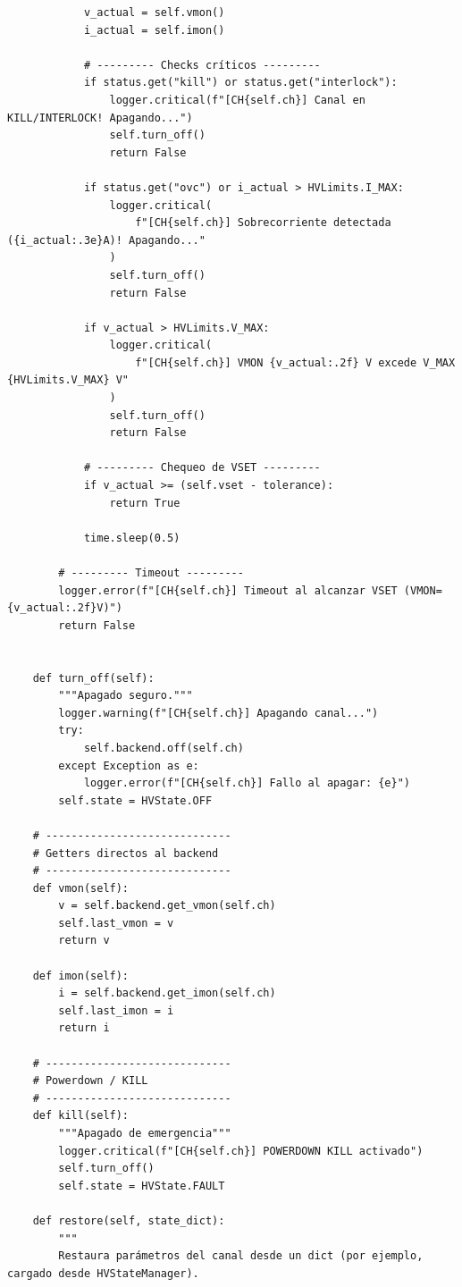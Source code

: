 \documentclass{article}
\begin{document}
\begin{lstlisting}
            v_actual = self.vmon()
            i_actual = self.imon()

            # --------- Checks críticos ---------
            if status.get("kill") or status.get("interlock"):
                logger.critical(f"[CH{self.ch}] Canal en KILL/INTERLOCK! Apagando...")
                self.turn_off()
                return False

            if status.get("ovc") or i_actual > HVLimits.I_MAX:
                logger.critical(
                    f"[CH{self.ch}] Sobrecorriente detectada ({i_actual:.3e}A)! Apagando..."
                )
                self.turn_off()
                return False

            if v_actual > HVLimits.V_MAX:
                logger.critical(
                    f"[CH{self.ch}] VMON {v_actual:.2f} V excede V_MAX {HVLimits.V_MAX} V"
                )
                self.turn_off()
                return False

            # --------- Chequeo de VSET ---------
            if v_actual >= (self.vset - tolerance):
                return True

            time.sleep(0.5)

        # --------- Timeout ---------
        logger.error(f"[CH{self.ch}] Timeout al alcanzar VSET (VMON={v_actual:.2f}V)")
        return False


    def turn_off(self):
        """Apagado seguro."""
        logger.warning(f"[CH{self.ch}] Apagando canal...")
        try:
            self.backend.off(self.ch)
        except Exception as e:
            logger.error(f"[CH{self.ch}] Fallo al apagar: {e}")
        self.state = HVState.OFF

    # -----------------------------
    # Getters directos al backend
    # -----------------------------
    def vmon(self):
        v = self.backend.get_vmon(self.ch)
        self.last_vmon = v
        return v

    def imon(self):
        i = self.backend.get_imon(self.ch)
        self.last_imon = i
        return i

    # -----------------------------
    # Powerdown / KILL
    # -----------------------------
    def kill(self):
        """Apagado de emergencia"""
        logger.critical(f"[CH{self.ch}] POWERDOWN KILL activado")
        self.turn_off()
        self.state = HVState.FAULT

    def restore(self, state_dict):
        """
        Restaura parámetros del canal desde un dict (por ejemplo, cargado desde HVStateManager).


\end{lstlisting}
\end{document}
